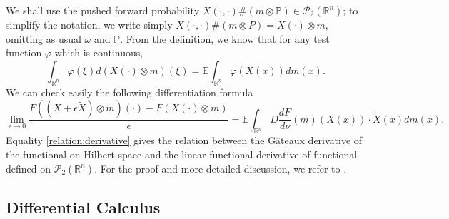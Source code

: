 \documentclass[11pt]{article}
\numberwithin{equation}{section}
\newcommand{\e}{\mathbb{E}}
\newcommand{\pr}{\mathcal{P}}
\newcommand{\brn}{{\mathbb{R}^n}}
\newcommand{\1}{\mbox{1\hspace{-1mm}I}}
\begin{document}
We shall use the pushed forward probability $X(\cdot,\cdot)\#(m\otimes \mathbb{P})\in\pr_2(\brn)$; to simplify the notation, we write simply $X(\cdot,\cdot)\#(m\otimes P)=X(\cdot)\otimes m$,
omitting as usual $\omega$ and $\mathbb{P}$. From the definition, we know that for any test function $\varphi$ which is continuous,
\begin{equation*}
    \int_{\brn}\varphi(\xi)d\left(X(\cdot)\otimes m\right)(\xi)=\e \int_\brn \varphi(X(x))dm(x).
\end{equation*}
We can check easily the following differentiation formula
\begin{equation}\label{relation:derivative}
    \lim_{\epsilon\to 0}\dfrac{F\left(\left(X+\epsilon\widetilde{X}\right)\otimes m\right)(\cdot)-F\left(X(\cdot)\otimes m\right)}{\epsilon}= \e\int_{\brn}D\dfrac{dF}{d\nu}(m)(X(x))\cdot \widetilde{X}(x)dm(x).
\end{equation}
Equality \eqref{relation:derivative} gives the relation between the G\^ateaux derivative of the functional on Hilbert space and the linear functional derivative of functional defined on $\pr_2(\brn)$. For the proof and more detailed discussion, we refer to \cite{AB6,AB10,AB5}. 


\subsection{Differential Calculus}
\end{document}
